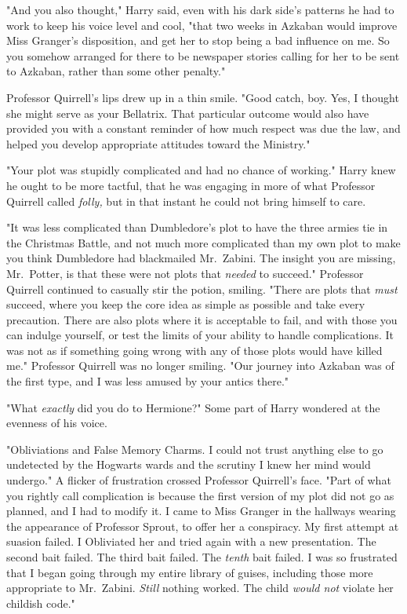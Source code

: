 "And you also thought," Harry said, even with his dark side's patterns he had 
to work to keep his voice level and cool, "that two weeks in Azkaban would 
improve Miss Granger's disposition, and get her to stop being a bad influence 
on me. So you somehow arranged for there to be newspaper stories calling for 
her to be sent to Azkaban, rather than some other penalty."

Professor Quirrell's lips drew up in a thin smile. "Good catch, boy. Yes, I 
thought she might serve as your Bellatrix. That particular outcome would also 
have provided you with a constant reminder of how much respect was due the law, 
and helped you develop appropriate attitudes toward the Ministry."

"Your plot was stupidly complicated and had no chance of working." Harry knew 
he ought to be more tactful, that he was engaging in more of what Professor 
Quirrell called \emph{folly,} but in that instant he could not bring himself to 
care.

"It was less complicated than Dumbledore's plot to have the three armies tie in 
the Christmas Battle, and not much more complicated than my own plot to make 
you think Dumbledore had blackmailed Mr.~Zabini. The insight you are missing, 
Mr.~Potter, is that these were not plots that \emph{needed} to succeed." 
Professor Quirrell continued to casually stir the potion, smiling. "There are 
plots that \emph{must} succeed, where you keep the core idea as simple as 
possible and take every precaution. There are also plots where it is acceptable 
to fail, and with those you can indulge yourself, or test the limits of your 
ability to handle complications. It was not as if something going wrong with 
any of those plots would have killed me." Professor Quirrell was no longer 
smiling. "Our journey into Azkaban was of the first type, and I was less amused 
by your antics there."

"What \emph{exactly} did you do to Hermione?" Some part of Harry wondered at 
the evenness of his voice.

"Obliviations and False Memory Charms. I could not trust anything else to go 
undetected by the Hogwarts wards and the scrutiny I knew her mind would 
undergo." A flicker of frustration crossed Professor Quirrell's face. "Part of 
what you rightly call complication is because the first version of my plot did 
not go as planned, and I had to modify it. I came to Miss Granger in the 
hallways wearing the appearance of Professor Sprout, to offer her a conspiracy. 
My first attempt at suasion failed. I Obliviated her and tried again with a new 
presentation. The second bait failed. The third bait failed. The \emph{tenth} 
bait failed. I was so frustrated that I began going through my entire library 
of guises, including those more appropriate to Mr.~Zabini. \emph{Still} nothing 
worked. The child \emph{would not} violate her childish code."

